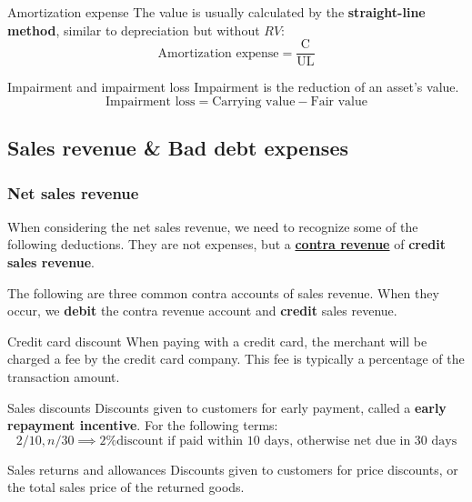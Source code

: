 \begin{knBox}
    {Amortization expense}
    The value is usually calculated by the \textbf{straight-line method}, similar to depreciation but without $RV$:
    \[\text{Amortization expense} = \frac{\text{C}}{\text{UL}}\]
\end{knBox}

\begin{knBox}
    {Impairment and impairment loss}
    Impairment is the reduction of an asset's value.
    \[\text{Impairment loss} = \text{Carrying value} - \text{Fair value}\]
\end{knBox}


\subsection{Sales revenue \& Bad debt expenses}

\subsubsection{Net sales revenue}

When considering the net sales revenue, we need to recognize some of the following deductions. They are not expenses, but a \hyperref[def:contra]{\textbf{contra revenue}} of \textbf{credit sales revenue}.

The following are three common contra accounts of sales revenue. When they occur, we \textbf{debit} the contra revenue account and \textbf{credit} sales revenue.

\begin{theorem}
    {Credit card discount}
    When paying with a credit card, the merchant will be charged a fee by the credit card company. This fee is typically a percentage of the transaction amount.
\end{theorem}

\begin{theorem}
    {Sales discounts}
    Discounts given to customers for early payment, called a \textbf{early repayment incentive}. For the following terms:
    \[2/10, n/30 \implies \text{2\% discount if paid within 10 days, otherwise net due in 30 days}\]
\end{theorem}

\begin{theorem}
    {Sales returns and allowances}
    Discounts given to customers for price discounts, or the total sales price of the returned goods.
\end{theorem}

